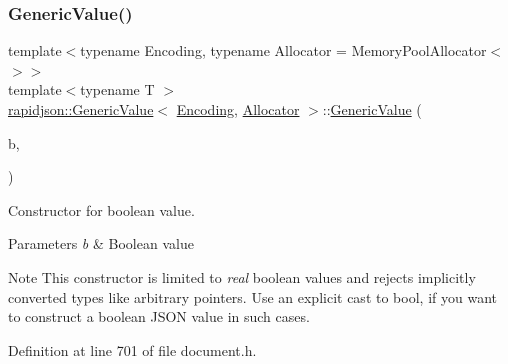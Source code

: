 \subsubsection{\texorpdfstring{GenericValue()}{GenericValue()}\hspace{0.1cm}{\footnotesize\ttfamily [5/17]}}
{\footnotesize\ttfamily template$<$typename Encoding, typename Allocator = Memory\+Pool\+Allocator$<$$>$$>$ \\
template$<$typename T $>$ \\
\mbox{\hyperlink{classrapidjson_1_1_generic_value}{rapidjson\+::\+Generic\+Value}}$<$ \mbox{\hyperlink{classrapidjson_1_1_encoding}{Encoding}}, \mbox{\hyperlink{classrapidjson_1_1_allocator}{Allocator}} $>$\+::\mbox{\hyperlink{classrapidjson_1_1_generic_value}{Generic\+Value}} (\begin{DoxyParamCaption}\item[{T}]{b,  }\item[{R\+A\+P\+I\+D\+J\+S\+O\+N\+\_\+\+E\+N\+A\+B\+L\+E\+IF((internal\+::\+Is\+Same$<$ bool, T $>$))}]{ }\end{DoxyParamCaption})\hspace{0.3cm}{\ttfamily [explicit]}}



Constructor for boolean value. 


\begin{DoxyParams}{Parameters}
{\em b} & Boolean value \\
\hline
\end{DoxyParams}
\begin{DoxyNote}{Note}
This constructor is limited to {\itshape real} boolean values and rejects implicitly converted types like arbitrary pointers. Use an explicit cast to {\ttfamily bool}, if you want to construct a boolean J\+S\+ON value in such cases. 
\end{DoxyNote}


Definition at line 701 of file document.\+h.


